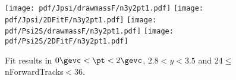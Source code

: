 \begin{figure}[H]
\begin{center}
\texttt{[image: pdf/Jpsi/drawmassF/n3y2pt1.pdf]}
\texttt{[image: pdf/Jpsi/2DFitF/n3y2pt1.pdf]}
\vspace*{-0.5cm}
\texttt{[image: pdf/Psi2S/drawmassF/n3y2pt1.pdf]}
\texttt{[image: pdf/Psi2S/2DFitF/n3y2pt1.pdf]}
\vspace*{-0.5cm}
\end{center}
\caption{Fit results in $0\gevc<\pt<2\gevc$, $2.8<y<3.5$ and 24$\leq$nForwardTracks$<$36.}
\label{Fitn3y2pt1}
\end{figure}
